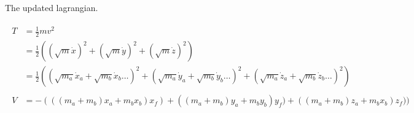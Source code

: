 \documentclass{scrartcl}
\begin{document}
\begin{comment}
  
\begin{split}
  \frac{\partial x_n}{\partial \phi_n}& = x_{n\phi}  = l_n \sin{\theta_n} \sin{\phi_n} \phi_n\\
  \frac{\partial y_n}{\partial \phi_n}& = y_{n\phi}  = l_n \sin{\theta_n} \cos{\phi_n} \phi_n\\
  \frac{\partial z_n}{\partial \phi_n}& = z_{n\phi}  = 0
\end{split}
\begin{split}
  \frac{\partial \dot{x}_n}{\partial \phi_n}& = \dot{x}_{n\phi} 
    = -l_n\sin{\theta_n} \cos{\phi_n} \dot{\phi}_n - l_n\cos{\theta_n}\sin{\phi_n} \dot{\theta}_n\\
  \frac{\partial \dot{y}_n}{\partial \phi_n}& = \dot{y}_{n\phi} 
    = -l_n\sin{\theta_n} \sin\phi_n \dot{\phi}_n + l_n\cos\theta_n\cos{\phi_n} \dot{\theta}_n\\
  \frac{\partial \dot{z}_n}{\partial \phi_n}& = \dot{z}_{n\phi} 
    = 0
\end{split}
\begin{split}
  \frac{\partial \dot{x}_n}{\partial \dot{\phi}}& = \dot{x}_{n\dot{\phi_n}} 
    = -l_n\sin{\theta_n} \sin{\phi_n} \\
  \frac{\partial \dot{y}_n}{\partial \dot{\phi}}& = \dot{y}_{n\dot{\phi_n}} 
    = l_n\sin{\theta_n} \cos\phi_n\\
  \frac{\partial \dot{z}_n}{\partial \dot{\phi}}& = \dot{z}_{n\dot{\phi_n}} 
    = 0
\end{split}
\end{comment}




The updated lagrangian.

\begin{align}
  \begin{split}
    T &= \frac{1}{2} m v^2                 \\
    &= \frac{1}{2} ((\sqrt{m}\dot{x})^2 + (\sqrt{m}\dot{y})^2 + (\sqrt{m}\dot{z})^2)                 \\
    &= \frac{1}{2} ((\sqrt{m_a}\dot{x}_a + \sqrt{m_b}\dot{x}_b \dots)^2 + (\sqrt{m_a}\dot{y}_a + \sqrt{m_b}\dot{y}_b \dots)^2 + (\sqrt{m_a}\dot{z}_a + \sqrt{m_b}\dot{z}_b \dots)^2)       
  \end{split} \\
  \begin{split}
    V &= -(((m_a + m_b) x_a + m_b x_b) x_f) + ((m_a + m_b) y_a + m_b y_b) y_f) + ((m_a + m_b) z_a + m_b x_b) z_f))
  \end{split}
\end{align}
\end{document}
